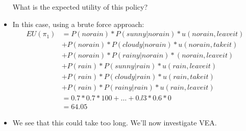 \documentclass{article}
\begin{document}
\begin{itemize}
\begin{itemize}
        \end{itemize}
    What is the expected utility of this policy?
    \item In this case, using a brute force approach:
        \begin{align*}
            EU(\pi_1) &= P(norain) * P(sunny|norain) * u(norain, leaveit)\\
                      &+ P(norain) * P(cloudy|norain) * u(norain, takeit)\\
                      &+ P(norain) * P(rainy|norain) * (norain, leaveit) \\
                      &+ P(rain) * P(sunny|rain) * u(rain, leaveit) \\
                      &+ P(rain) * P(cloudy|rain) * u(rain, takeit) \\
                      &+ P(rain) * P(rainy|rain) * u(rain, leaveit) \\
                      &= 0.7 * 0.7 * 100 + \dots + 0.l3 * 0.6 * 0 \\
                      &= 64.05
        \end{align*}
    \item We see that this could take too long.  We'll now investigate VEA.
\end{itemize}
\end{document}
